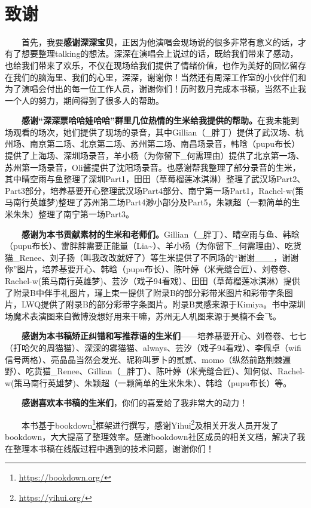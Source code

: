 \documentclass[]{ctexbook}
\renewcommand{\href}[2]{#2\footnote{\url{#1}}}
\begin{document}
  

\newpage

\section*{致谢}\label{Acknowledgments}


  首先，我要\textbf{感谢深深宝贝}，正因为他演唱会现场说的很多非常有意义的话，才有了想要整理talking的想法。深深在演唱会上说过的话，既给我们带来了感动，也给我们带来了欢乐，不仅在现场给我们提供了情绪价值，也作为美好的回忆留存在我们的脑海里、我们的心里，深深，谢谢你！当然还有周深工作室的小伙伴们和为了演唱会付出的每一位工作人员，谢谢你们！历时数月完成本书稿，当然不止我一个人的努力，期间得到了很多人的帮助。

  \textbf{感谢``深深票哈哈娃哈哈''群里几位热情的生米给我提供的帮助。}在我未能到场观看的场次，她们提供了现场的录音，其中Gillian（\_胖丁）提供了武汉场、杭州场、南京第二场、北京第二场、苏州第二场、南昌场录音，韩晗（pupu布长）提供了上海场、深圳场录音，羊小杨（为你留下\_何需理由）提供了北京第一场、苏州第一场录音，Oli酱提供了沈阳场录音。也感谢帮我整理了部分录音的生米，其中晴空雨与鱼整理了深圳Part1，田田（草莓榴莲冰淇淋）整理了武汉场Part2、Part3部分，培养基要开心整理武汉场Part4部分、南宁第一场Part1，Rachel-w(策马南行英雄梦)整理了苏州第二场Part4渺小部分及Part5，朱颖超（一颗简单的生米朱朱）整理了南宁第一场Part3。

  \textbf{感谢为本书贡献素材的生米和老师们。}Gillian（\_胖丁）、晴空雨与鱼、韩晗（pupu布长）、雷胖胖需要正能量（Lia\textasciitilde）、羊小杨（为你留下\_何需理由）、吃货猫\_Renee、刘子扬（叫我改改就好了）等生米提供了不同场的``谢谢\_\_\_，谢谢你''图片，培养基要开心、韩晗（pupu布长）、陈叶婷（米壳缝合匠）、刘卷卷、Rachel-w(策马南行英雄梦)、芸汐（戏子94看戏）、田田（草莓榴莲冰淇淋）提供了附录B中伴手礼图片，瑾上束一提供了附录B的部分彩带米图片和彩带字条图片，LWQ提供了附录B的部分彩带字条图片。附录B灵感来源于Kimiya。书中深圳场魔术表演图来自微博没想好用来干嘛，苏州无人机图来源于昊楠不会飞。

  \textbf{感谢为本书稿矫正纠错和写推荐语的生米们}------培养基要开心、刘卷卷、七七（打哈欠的周猫猫）、深深的雾猫猫、always、芸汐（戏子94看戏）、李佩卓（wifi信号两格）、亮晶晶当然会发光、昵称叫萝卜的贰贰、momo（纵然前路荆棘遍野）、吃货猫\_Renee、Gillian（\_胖丁）、陈叶婷（米壳缝合匠）、知何似、Rachel-w(策马南行英雄梦)、朱颖超（一颗简单的生米朱朱）、韩晗（pupu布长）等。

  \textbf{感谢喜欢本书稿的生米们}，你们的喜爱给了我非常大的动力！

  本书基于\href{https://bookdown.org/}{bookdown}框架进行撰写，感谢\href{https://yihui.org/}{Yihui}及相关开发人员开发了bookdown，大大提高了整理效率。感谢bookdown社区成员的相关文档，解决了我在整理本书稿在线版过程中遇到的技术问题，谢谢你们！
\end{document}
